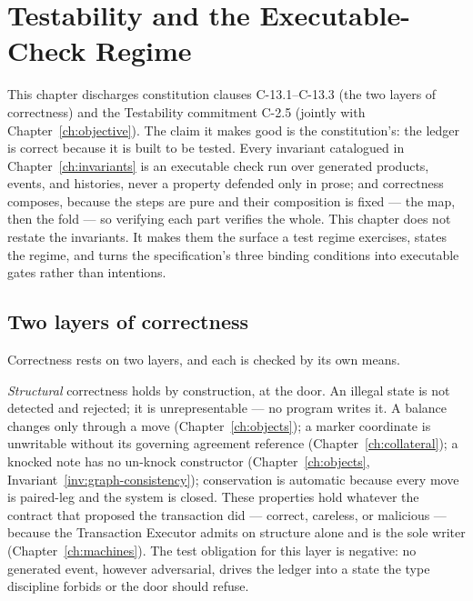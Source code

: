 \section{Testability and the Executable-Check Regime}\label{ch:testability}

This chapter discharges constitution clauses C-13.1--C-13.3 (the two layers of correctness) and the Testability commitment C-2.5 (jointly with Chapter~\ref{ch:objective}). The claim it makes good is the constitution's: the
ledger is correct because it is built to be tested. Every invariant catalogued in
Chapter~\ref{ch:invariants} is an executable check run over generated products, events, and
histories, never a property defended only in prose; and correctness composes, because the
steps are pure and their composition is fixed --- the map, then the fold --- so verifying
each part verifies the whole. This chapter does not restate the invariants. It makes them
the surface a test regime exercises, states the regime, and turns the specification's three
binding conditions into executable gates rather than intentions.

\subsection{Two layers of correctness}

Correctness rests on two layers, and each is checked by its own means.

\emph{Structural} correctness holds by construction, at the door. An illegal state is not
detected and rejected; it is unrepresentable --- no program writes it. A balance changes
only through a move (Chapter~\ref{ch:objects}); a marker coordinate is unwritable without
its governing agreement reference (Chapter~\ref{ch:collateral}); a knocked note has no
un-knock constructor (Chapter~\ref{ch:objects}, Invariant~\ref{inv:graph-consistency});
conservation is automatic because every move is paired-leg and the system is closed. These
properties hold whatever the contract that proposed the transaction did --- correct,
careless, or malicious --- because the Transaction Executor admits on structure alone and
is the sole writer (Chapter~\ref{ch:machines}). The test obligation for this layer is
negative: no generated event, however adversarial, drives the ledger into a state the type
discipline forbids or the door should refuse.


